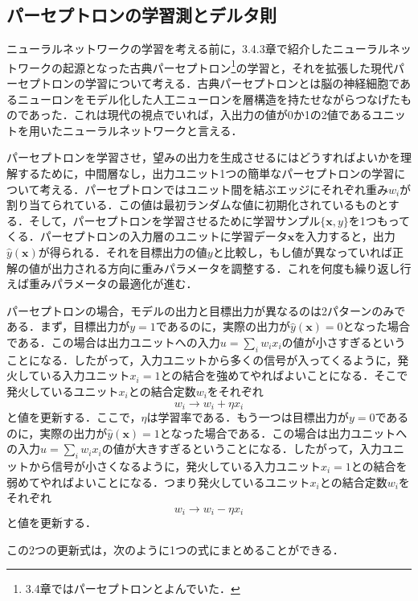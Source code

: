 \documentclass[a4paper,11pt]{jsreport}
\begin{document}
\subsection{パーセプトロンの学習測とデルタ則}
ニューラルネットワークの学習を考える前に，3.4.3章で紹介したニューラルネットワークの起源となった古典パーセプトロン\footnote{3.4章ではパーセプトロンとよんでいた．}の学習と，それを拡張した現代パーセプトロンの学習について考える．古典パーセプトロンとは脳の神経細胞であるニューロンをモデル化した人工ニューロンを層構造を持たせながらつなげたものであった．これは現代の視点でいれば，入出力の値が0か1の2値であるユニットを用いたニューラルネットワークと言える．\par
パーセプトロンを学習させ，望みの出力を生成させるにはどうすればよいかを理解するために，中間層なし，出力ユニット1つの簡単なパーセプトロンの学習について考える．パーセプトロンではユニット間を結ぶエッジにそれぞれ重み$w_i$が割り当てられている．この値は最初ランダムな値に初期化されているものとする．そして，パーセプトロンを学習させるために学習サンプル$\{\bm{x}, y\}$を1つもってくる．パーセプトロンの入力層のユニットに学習データ$\bm{x}$を入力すると，出力$\hat{y}(\bm{x})$が得られる．それを目標出力の値$y$と比較し，もし値が異なっていれば正解の値が出力される方向に重みパラメータを調整する．これを何度も繰り返し行えば重みパラメータの最適化が進む．\par
パーセプトロンの場合，モデルの出力と目標出力が異なるのは2パターンのみである．まず，目標出力が$y=1$であるのに，実際の出力が$\hat{y}(\bm{x})=0$となった場合である．この場合は出力ユニットへの入力$u=\sum_{i}w_i x_i$の値が小さすぎるということになる．したがって，入力ユニットから多くの信号が入ってくるように，発火している入力ユニット$x_i=1$との結合を強めてやればよいことになる．そこで発火しているユニット$x_i$との結合定数$w_i$をそれぞれ
\begin{equation}
  w_i \rightarrow w_i + \eta x_i
\end{equation} 
と値を更新する．ここで，$\eta$は学習率である．もう一つは目標出力が$y=0$であるのに，実際の出力が$\hat{y}(\bm{x})=1$となった場合である．この場合は出力ユニットへの入力$u=\sum_{i}w_i x_i$の値が大きすぎるということになる．したがって，入力ユニットから信号が小さくなるように，発火している入力ユニット$x_i=1$との結合を弱めてやればよいことになる．つまり発火しているユニット$x_i$との結合定数$w_i$をそれぞれ
\begin{equation}
  w_i \rightarrow w_i - \eta x_i
\end{equation} 
と値を更新する．\par
この2つの更新式は，次のように1つの式にまとめることができる．
\end{document}
